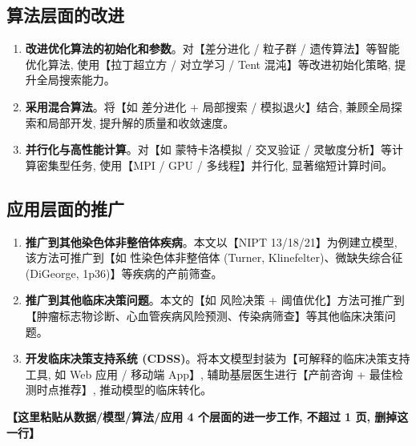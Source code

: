 \subsection{算法层面的改进}

\begin{enumerate}
  \item \textbf{改进优化算法的初始化和参数}。对【差分进化 / 粒子群 / 遗传算法】等智能优化算法, 使用【拉丁超立方 / 对立学习 / Tent 混沌】等改进初始化策略, 提升全局搜索能力。

  \item \textbf{采用混合算法}。将【如 差分进化 + 局部搜索 / 模拟退火】结合, 兼顾全局探索和局部开发, 提升解的质量和收敛速度。

  \item \textbf{并行化与高性能计算}。对【如 蒙特卡洛模拟 / 交叉验证 / 灵敏度分析】等计算密集型任务, 使用【MPI / GPU / 多线程】并行化, 显著缩短计算时间。
\end{enumerate}

\subsection{应用层面的推广}

\begin{enumerate}
  \item \textbf{推广到其他染色体非整倍体疾病}。本文以【NIPT 13/18/21】为例建立模型, 该方法可推广到【如 性染色体非整倍体 (Turner, Klinefelter)、微缺失综合征 (DiGeorge, 1p36)】等疾病的产前筛查。

  \item \textbf{推广到其他临床决策问题}。本文的【如 风险决策 + 阈值优化】方法可推广到【肿瘤标志物诊断、心血管疾病风险预测、传染病筛查】等其他临床决策问题。

  \item \textbf{开发临床决策支持系统 (CDSS)}。将本文模型封装为【可解释的临床决策支持工具, 如 Web 应用 / 移动端 App】, 辅助基层医生进行【产前咨询 + 最佳检测时点推荐】, 推动模型的临床转化。
\end{enumerate}

\textbf{【这里粘贴从数据/模型/算法/应用 4 个层面的进一步工作, 不超过 1 页, 删掉这一行】}
